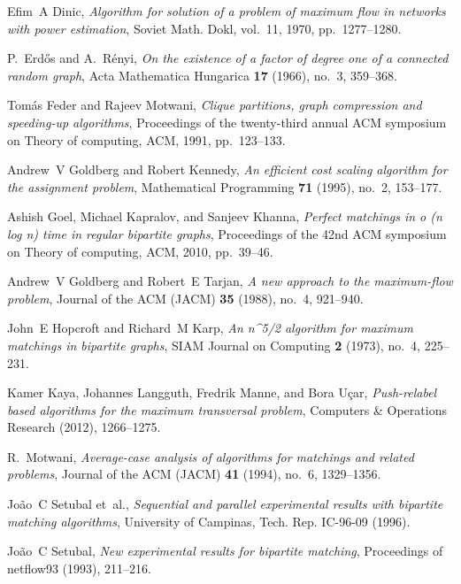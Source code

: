 \documentclass[11pt,onecolumn]{article}
\begin{document}
\begin{thebibliography}{BoTLfIS90}
Efim~A Dinic, \emph{Algorithm for solution of a problem of maximum flow in
  networks with power estimation}, Soviet Math. Dokl, vol.~11, 1970,
  pp.~1277--1280.

P.~Erd{\H{o}}s and A.~R{\'e}nyi, \emph{On the existence of a factor of degree
  one of a connected random graph}, Acta Mathematica Hungarica \textbf{17}
  (1966), no.~3, 359--368.

Tom{\'a}s Feder and Rajeev Motwani, \emph{Clique partitions, graph compression
  and speeding-up algorithms}, Proceedings of the twenty-third annual ACM
  symposium on Theory of computing, ACM, 1991, pp.~123--133.

Andrew~V Goldberg and Robert Kennedy, \emph{An efficient cost scaling algorithm
  for the assignment problem}, Mathematical Programming \textbf{71} (1995),
  no.~2, 153--177.

Ashish Goel, Michael Kapralov, and Sanjeev Khanna, \emph{Perfect matchings in o
  (n log n) time in regular bipartite graphs}, Proceedings of the 42nd ACM
  symposium on Theory of computing, ACM, 2010, pp.~39--46.

Andrew~V Goldberg and Robert~E Tarjan, \emph{A new approach to the maximum-flow
  problem}, Journal of the ACM (JACM) \textbf{35} (1988), no.~4, 921--940.

John~E Hopcroft and Richard~M Karp, \emph{An n\^{}5/2 algorithm for maximum
  matchings in bipartite graphs}, SIAM Journal on Computing \textbf{2} (1973),
  no.~4, 225--231.

Kamer Kaya, Johannes Langguth, Fredrik Manne, and Bora U{\c{c}}ar,
  \emph{Push-relabel based algorithms for the maximum transversal problem},
  Computers \& Operations Research (2012), 1266--1275.

R.~Motwani, \emph{Average-case analysis of algorithms for matchings and related
  problems}, Journal of the ACM (JACM) \textbf{41} (1994), no.~6, 1329--1356.

Jo{\~a}o~C Setubal et~al., \emph{Sequential and parallel experimental results
  with bipartite matching algorithms}, University of Campinas, Tech. Rep.
  IC-96-09 (1996).

Jo{\~a}o~C Setubal, \emph{New experimental results for bipartite matching},
  Proceedings of netflow93 (1993), 211--216.

\end{thebibliography}
\end{document}
